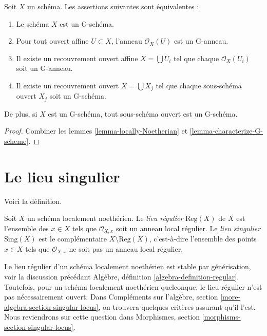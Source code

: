 \begin{lemma}
\label{lemma-locally-G-scheme}
Soit $X$ un schéma. Les assertions suivantes sont équivalentes :
\begin{enumerate}
\item Le schéma $X$ est un G-schéma.
\item Pour tout ouvert affine $U \subset X$, l'anneau $\mathcal{O}_X(U)$
est un G-anneau.
\item Il existe un recouvrement ouvert affine $X = \bigcup U_i$ tel que
chaque $\mathcal{O}_X(U_i)$ soit un G-anneau.
\item Il existe un recouvrement ouvert $X = \bigcup X_j$
tel que chaque sous-schéma ouvert $X_j$ soit un G-schéma.
\end{enumerate}
De plus, si $X$ est un G-schéma, tout sous-schéma ouvert est un
G-schéma.
\end{lemma}

\begin{proof}
Combiner les lemmes \ref{lemma-locally-Noetherian}
et \ref{lemma-characterize-G-scheme}.
\end{proof}

\section{Le lieu singulier}
\label{section-singular-locus}

\noindent
Voici la définition.

\begin{definition}
\label{definition-singular-locus}
Soit $X$ un schéma localement noethérien. Le {\it lieu régulier}
$\text{Reg}(X)$ de $X$ est l'ensemble des $x \in X$ tels que $\mathcal{O}_{X, x}$
soit un anneau local régulier. Le {\it lieu singulier} $\text{Sing}(X)$ est le
complémentaire $X \setminus \text{Reg}(X)$, c'est-à-dire l'ensemble des points $x \in X$
tels que $\mathcal{O}_{X, x}$ ne soit pas un anneau local régulier.
\end{definition}

\noindent
Le lieu régulier d'un schéma localement noethérien est stable par
générisation, voir la discussion précédant
Algèbre, définition \ref{algebra-definition-regular}.
Toutefois, pour un schéma localement noethérien quelconque, le lieu régulier
n'est pas nécessairement ouvert. Dans
Compléments sur l'algèbre, section \ref{more-algebra-section-singular-locus},
on trouvera quelques critères assurant qu'il l'est.
Nous reviendrons sur cette question dans
Morphismes, section \ref{morphisms-section-singular-locus}.

